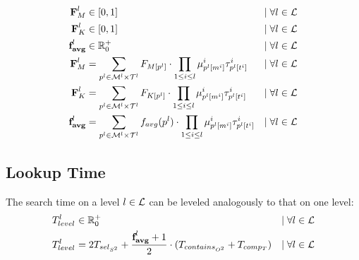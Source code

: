\documentclass[a4paper,titlepage,onecolumn,oneside,12pt,nenglish,titlepage=firstiscover]{scrbook}
\theoremstyle{plain} %
\theoremstyle{definition} %
\theoremstyle{remark} %
\theoremstyle{plain}
\newcommand{\RR}{\mathbb{R}} %
\newcommand{\minimizerLength}{m}
\newcommand{\threshold}{t}
\newcommand{\level}{l}
\newcommand{\contains}{contains}
\newcommand{\select}{sel}
\newcommand{\compare}{comp}
\newcommand{\timeForOperationOnStructure}[2]{T_{#1_{#2}}} %
\newcommand{\varAverageFrequency}{\textbf{f}_{\textbf{avg}}}
\newcommand{\averageFrequency}{f_{avg}}
\newcommand{\possibleMinimizerLengths}{\mathcal{M}}
\newcommand{\possibleThresholds}{\mathcal{T}}
\newcommand{\indicatorm}{\mu}
\newcommand{\indicatort}{\tau}
\begin{document}
\begin{align*}
	\varCDF{M}^\level &\in [0,1] &\mid \forall l \in \setOfLevels
	\\
	\varCDF{K}^\level &\in [0,1] &\mid \forall l \in \setOfLevels
	\\
	\varAverageFrequency^\level &\in \RR^+_0 &\mid \forall l \in \setOfLevels
	\\
	\varCDF{M}^\level &= \sum\limits_{\levelParameters{\level} \in \possibleMinimizerLengths^\level \times \possibleThresholds^\level}
	\CDF{\compactZV{M}{\levelParameters{\level}}} 
	\cdot
	\prod_{1\leq i \leq \level} \indicatorm^i_{\parameterAccess{\level}{\minimizerLength}{i}} \indicatort^i_{\parameterAccess{\level}{\threshold}{i}}
	& \mid \forall l \in \setOfLevels
	\\
	\varCDF{K}^\level &= \sum\limits_{\levelParameters{\level} \in \possibleMinimizerLengths^\level \times \possibleThresholds^\level}
	\CDF{\compactZV{K}{\levelParameters{\level}}}
	\cdot
	\prod_{1\leq i \leq \level} \indicatorm^i_{\parameterAccess{\level}{\minimizerLength}{i}} \indicatort^i_{\parameterAccess{\level}{\threshold}{i}}
	& \mid \forall l \in \setOfLevels
	\\
	\varAverageFrequency^\level &= \sum\limits_{\levelParameters{\level} \in \possibleMinimizerLengths^\level \times \possibleThresholds^\level}
	\averageFrequency(\levelParameters{\level})
	\cdot
	\prod_{1\leq i \leq \level} \indicatorm^i_{\parameterAccess{\level}{\minimizerLength}{i}} \indicatort^i_{\parameterAccess{\level}{\threshold}{i}}
	& \mid \forall l \in \setOfLevels
\end{align*}

\subsection{Lookup Time}
The search time on a level $l \in \mathcal{L}$ can be leveled analogously to that on one level:
\begin{align*}
	\timeForOperationOnStructure{level}{}^\level & \in \RR^+_0 &\mid \forall l \in \setOfLevels\\
	\timeForOperationOnStructure{level}{}^\level &= 2\timeForOperationOnStructure{\select}{S^2} + \frac{\varAverageFrequency^\level+1}{2}  \cdot (\timeForOperationOnStructure{\contains}{O^2} + \timeForOperationOnStructure{\compare}{T}) &\mid \forall l \in \setOfLevels
\end{align*}
\end{document}
